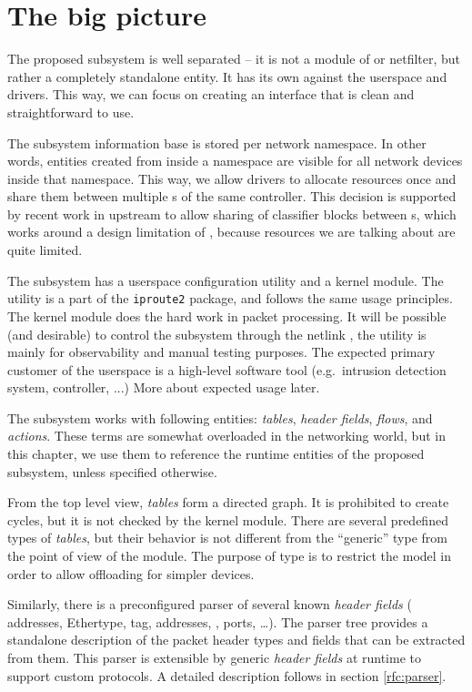 
\section{The big picture}

The proposed subsystem is well separated -- it is not a module of
 or netfilter, but rather a completely standalone entity. It has its
own  against the userspace and drivers. This way, we can focus on creating
an interface that is clean and straightforward to use.

The subsystem information base is stored per network namespace. In other
words, entities created from inside a namespace are visible for all network devices
inside that namespace. This way, we allow drivers to allocate resources once and
share them between multiple \netdev s of the same controller. This decision
is supported by recent work in upstream to allow sharing of  classifier
blocks between \netdev s, which works around a design limitation of , because
resources we are talking about are quite limited.

The subsystem has a userspace configuration utility and a kernel module.
The utility is a part of the \texttt{iproute2} package, and follows
the same usage principles. The kernel module does the hard work in packet
processing. It will be possible (and desirable) to control the subsystem
through the netlink , the utility is mainly for observability and manual testing
purposes. The expected primary customer of the userspace  is a high-level
software tool (e.g.\ intrusion detection system,  controller, ...) More
about expected usage later.

The subsystem works with following entities: \emph{tables}, \emph{header
fields}, \emph{flows}, and \emph{actions}. These terms are somewhat overloaded in
the networking world, but in this chapter, we use them to reference the runtime
entities of the proposed subsystem, unless specified otherwise.

From the top level view, \emph{tables} form a directed graph. It
is prohibited to create cycles, but it is not checked by the kernel
module. There are several predefined types of \emph{tables}, but their
behavior is not different from the ``generic'' type from the point of
view of the module. The purpose of type is to restrict the model in order to
allow offloading for simpler devices.

Similarly, there is a preconfigured parser of several known \emph{header fields}
( addresses, Ethertype,  tag,  addresses, , ports,
\dots). The parser tree provides a standalone
description of the packet header types and fields that can be extracted from them. This
parser is extensible by generic \emph{header fields} at runtime to support
custom protocols. A detailed description follows in section \ref{rfc:parser}.

